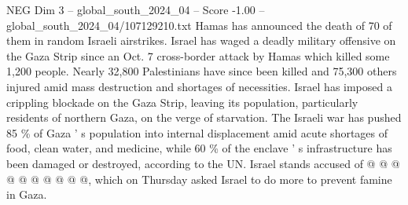 \begin{textsample}{NEG Dim 3 – global\_south\_2024\_04 – Score -1.00 – global\_south\_2024\_04/107129210.txt}
Hamas has announced the death of 70 of them in random Israeli airstrikes.
Israel has waged a deadly military offensive on the Gaza Strip since an Oct. 7 cross-border attack by Hamas which killed some 1,200 people.
Nearly 32,800 Palestinians have since been killed and 75,300 others injured amid mass destruction and shortages of necessities.
Israel has imposed a crippling blockade on the Gaza Strip, leaving its population, particularly residents of northern Gaza, on the verge of starvation.
The Israeli war has pushed 85 \% of Gaza ' s population into internal displacement amid acute shortages of food, clean water, and medicine, while 60 \% of the enclave ' s infrastructure has been damaged or destroyed, according to the UN.
Israel stands accused of @ @ @ @ @ @ @ @ @ @, which on Thursday asked Israel to do more to prevent famine in Gaza.

\end{textsample}
